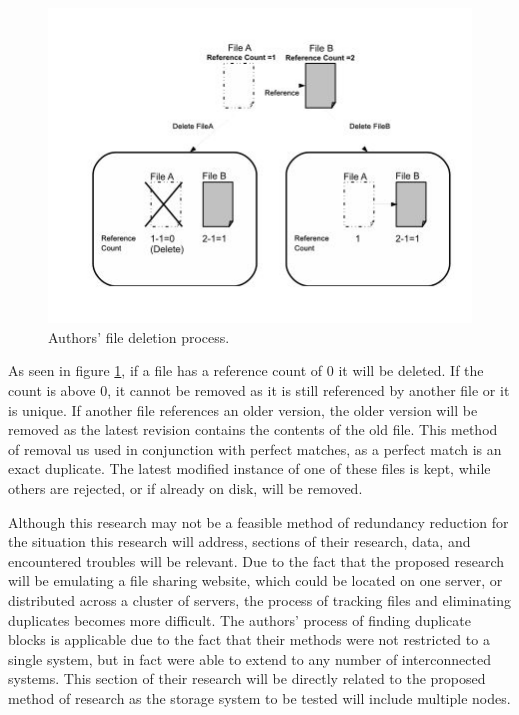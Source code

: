 \documentclass[11pt]{article}
\begin{document}
\begin{figure}
\begin{center}
\includegraphics[scale=.8]{delete}
\caption{\label{fig:delete} Authors' file deletion process.}
\end{center}
\end{figure}

As seen in figure \ref{fig:delete}, if a file has a reference count of 0 it will be deleted. If the count is above 0, it cannot be removed as it is still referenced by another file or it is unique. If another file references an older version, the older version will be removed as the latest revision contains the contents of the old file. This method of removal us used in conjunction with perfect matches, as a perfect match is an exact duplicate. The latest modified instance of one of these files is kept, while others are rejected, or if already on disk, will be removed.

Although this research may not be a feasible method of redundancy reduction for the situation this research will address, sections of their research, data, and encountered troubles will be relevant. Due to the fact that the proposed research will be emulating a file sharing website, which could be located on one server, or distributed across a cluster of servers, the process of tracking files and eliminating duplicates becomes more difficult. The authors' process of finding duplicate blocks is applicable due to the fact that their methods were not restricted to a single system, but in fact were able to extend to any number of interconnected systems. This section of their research will be directly related to the proposed method of research as the storage system to be tested will include multiple nodes.
\end{document}
